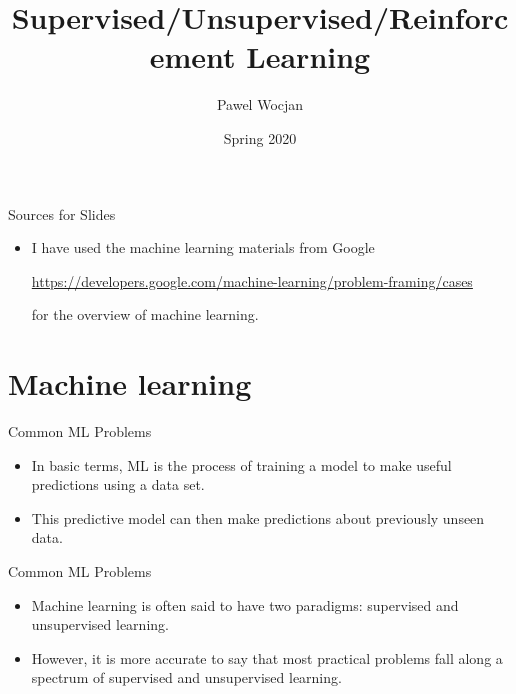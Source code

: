 \documentclass{beamer}
\title[AI]{Supervised/Unsupervised/Reinforcement Learning}
\author{Pawel Wocjan}
\institute{University of Central Florida}
\date{Spring 2020}
\begin{document}
\begin{frame}
  \titlepage
\end{frame}

\begin{frame}{Sources for Slides}

\begin{itemize}
\item I have used the machine learning materials from Google

{\small 
\url{https://developers.google.com/machine-learning/problem-framing/cases}
}

for the overview of machine learning.
\end{itemize}
\end{frame}


\section{Machine learning}

\begin{frame}{Common ML Problems}

\begin{itemize}

\item In basic terms, ML is the process of training a model to make useful predictions using a data set. 

\item This predictive model can then make predictions about previously unseen data. 
\end{itemize}

\end{frame}


\begin{frame}{Common ML Problems}

\begin{itemize}

\item Machine learning is often said to have two paradigms: supervised and unsupervised learning. 

\item However, it is more accurate to say that most practical problems fall along a spectrum of supervised and unsupervised learning.
\end{itemize}

\end{frame}
\end{document}
